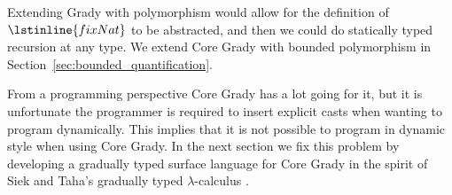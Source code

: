 Extending Grady with polymorphism would allow for the definition of
$\lstinline{fixNat}$ to be abstracted, and then we could do statically
typed recursion at any type.  We extend Core Grady with bounded
polymorphism in Section~\ref{sec:bounded_quantification}.

From a programming perspective Core Grady has a lot going for it, but
it is unfortunate the programmer is required to insert explicit casts
when wanting to program dynamically.  This implies that it is not
possible to program in dynamic style when using Core Grady.  In the
next section we fix this problem by developing a gradually typed
surface language for Core Grady in the spirit of Siek and Taha's
gradually typed $\lambda$-calculus \cite{Siek:2006,Siek:2015}.

